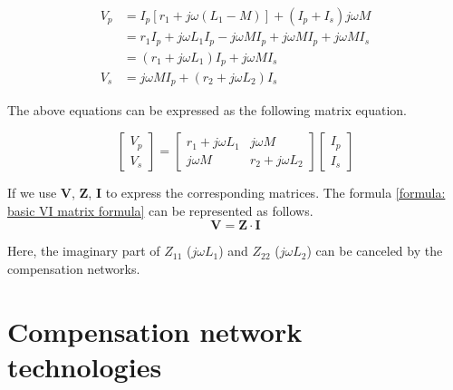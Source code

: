\begin{equation}
    \begin{align}
        V_p & = I_p[r_1+j\omega(L_1-M)]+(I_p+I_s)j\omega M                           \\
            & = r_1 I_p + j\omega L_1 I_p - j\omega M I_p+j \omega MI_p+j\omega MI_s \\
            & = (r_1+j\omega L_1)I_p + j\omega MI_s                                  \\
        V_s & = j\omega MI_p + (r_2+j \omega L_2)I_s
    \end{align}
\end{equation}

The above equations can be expressed as the following matrix equation.

\begin{equation}
    \begin{bmatrix}
        V_p \\
        V_s
    \end{bmatrix}
    =
    \begin{bmatrix}
        r_1 + j\omega L_1 & j\omega M        \\
        j\omega M         & r_2+ j\omega L_2
    \end{bmatrix}
    \begin{bmatrix}
        I_p \\
        I_s
    \end{bmatrix}
    \label{formula: basic VI matrix formula}
\end{equation}

If we use $\mathbf{V}$, $\mathbf{Z}$, $\mathbf{I}$ to express the corresponding matrices. The formula \ref{formula: basic VI matrix formula} can be represented as follows.
\begin{equation}
    \mathbf{V} = \mathbf{Z}\cdot\mathbf{I}
\end{equation}

Here, the imaginary part of $Z_{11}$ ($j\omega L_1$) and $Z_{22}$ ($j\omega L_2$) can be canceled by the compensation networks.

\section{Compensation network technologies}

